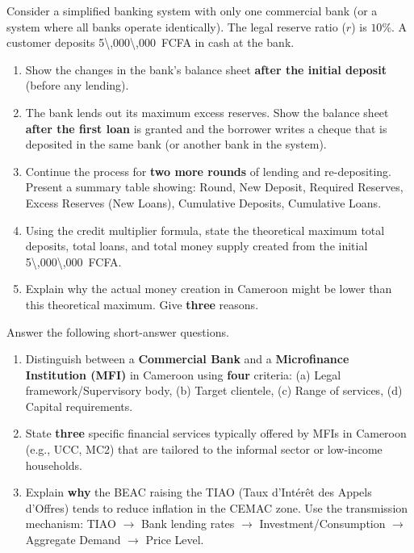 \documentclass[11pt]{article}
\begin{document}
\begin{exercice}
Consider a simplified banking system with only one commercial bank (or a system where all banks operate identically). The legal reserve ratio ($r$) is $10\%$. A customer deposits \SI{5\,000\,000}{FCFA} in cash at the bank.

\begin{enumerate}
\item Show the changes in the bank's balance sheet \textbf{after the initial deposit} (before any lending).
\item The bank lends out its maximum excess reserves. Show the balance sheet \textbf{after the first loan} is granted and the borrower writes a cheque that is deposited in the same bank (or another bank in the system).
\item Continue the process for \textbf{two more rounds} of lending and re-depositing. Present a summary table showing: Round, New Deposit, Required Reserves, Excess Reserves (New Loans), Cumulative Deposits, Cumulative Loans.
\item Using the credit multiplier formula, state the theoretical maximum total deposits, total loans, and total money supply created from the initial \SI{5\,000\,000}{FCFA}.
\item Explain why the actual money creation in Cameroon might be lower than this theoretical maximum. Give \textbf{three} reasons.
\end{enumerate}
\end{exercice}

\begin{exercice}
Answer the following short-answer questions.

\begin{enumerate}
\item Distinguish between a \textbf{Commercial Bank} and a \textbf{Microfinance Institution (MFI)} in Cameroon using \textbf{four} criteria: (a) Legal framework/Supervisory body, (b) Target clientele, (c) Range of services, (d) Capital requirements.
\item State \textbf{three} specific financial services typically offered by MFIs in Cameroon (e.g., UCC, MC2) that are tailored to the informal sector or low-income households.
\item Explain \textbf{why} the BEAC raising the TIAO (Taux d'Intérêt des Appels d'Offres) tends to reduce inflation in the CEMAC zone. Use the transmission mechanism: TIAO $\rightarrow$ Bank lending rates $\rightarrow$ Investment/Consumption $\rightarrow$ Aggregate Demand $\rightarrow$ Price Level.
\end{enumerate}
\end{exercice}
\end{document}
